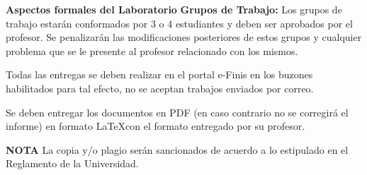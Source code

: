 \documentclass[a4paper]{article}
\begin{document}
\newpage
\textbf{Aspectos formales del Laboratorio}
{\bf{Grupos de Trabajo}:} Los grupos de trabajo estarán conformados por 3 o 4 estudiantes y
deben ser aprobados por el profesor. Se penalizarán las modificaciones posteriores de
estos grupos y cualquier problema que se le presente al profesor relacionado con los
mismos.
\vspace*{.5cm}

Todas las entregas se deben realizar en el portal e-Finis en los buzones habilitados para
tal efecto, no se aceptan trabajos enviados por correo. 

\vspace*{.5cm}

Se deben entregar los documentos en PDF (en caso contrario no se corregirá el informe)
en formato \LaTeX  con el formato entregado por su profesor.



{\bf{NOTA}}
La copia y/o plagio serán sancionados de acuerdo a lo estipulado en el Reglamento de la
Universidad.
\end{document}
